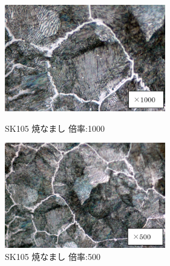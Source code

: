\documentclass[10pt,a4j]{jsarticle}
\begin{document}
  \begin{figure}[htbp]
    \begin{minipage}{0.5\hsize}
      \begin{center}
        \includegraphics[width=7cm]{../img/SK105_yakinamashi_1000.png}
        \caption{SK105 焼なまし 倍率:1000}
      \end{center}
    \end{minipage}
    \begin{minipage}{0.5\hsize}
      \begin{center}
        \includegraphics[width=7cm]{../img/SK105_yakinamashi_500.png}
        \caption{SK105 焼なまし 倍率:500}
      \end{center}
    \end{minipage}
  \end{figure}
\end{document}

